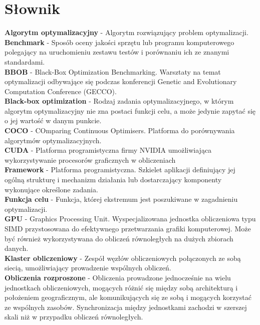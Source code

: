 \documentclass[12pt, twoside, openany, abstract=on]{report}
\theoremstyle{definition}
\begin{document}

\chapter{Słownik}

\textbf{Algorytm optymalizacyjny} - Algorytm rozwiązujący problem optymalizacji.\\
\textbf{Benchmark} - Sposób oceny jakości sprzętu lub programu komputerowego polegający na uruchomieniu zestawu testów i porównaniu ich ze znanymi standardami.\\
\textbf{BBOB} - Black-Box Optimization Benchmarking. Warsztaty na temat optymalizacji odbywające się podczas konferencji Genetic and Evolutionary Computation Conference (GECCO).\\
\textbf{Black-box optimization} - Rodzaj zadania optymalizacyjnego, w którym algorytm optymalizacyjny nie zna postaci funkcji celu, a może jedynie zapytać się o jej wartość w danym punkcie.\\
\textbf{COCO} - COmparing Continuous Optimisers. Platforma do porównywania algorytmów optymalizacyjnych.\\
\textbf{CUDA} - Platforma programistyczna firmy NVIDIA umożliwiająca wykorzystywanie procesorów graficznych w obliczeniach\\
\textbf{Framework} - Platforma programistyczna. Szkielet aplikacji definiujący jej ogólną strukturę i mechanizm działania lub dostarczający komponenty wykonujące określone zadania.\\
\textbf{Funkcja celu} - Funkcja, której ekstremum jest poszukiwane w zagadnieniu optymalizacji.\\
\textbf{GPU} - Graphics Processing Unit. Wyspecjalizowana jednostka obliczeniowa typu SIMD przystosowana do efektywnego przetwarzania grafiki komputerowej. Może być również wykorzystywana do obliczeń równoległych na dużych zbiorach danych.\\
\textbf{Klaster obliczeniowy} - Zespół węzłów obliczeniowych połączonych ze sobą siecią, umożliwiający prowadzenie wspólnych obliczeń.\\
\textbf{Obliczenia rozproszone} - Obliczenia prowadzone jednocześnie na wielu jednostkach obliczeniowych, mogących różnić się między sobą architekturą i położeniem geograficznym, ale komunikujących się ze sobą i mogących korzystać ze wspólnych zasobów. Synchronizacja między jednostkami zachodzi w szerszej skali niż w przypadku obliczeń równoległych.\\
\end{document}
